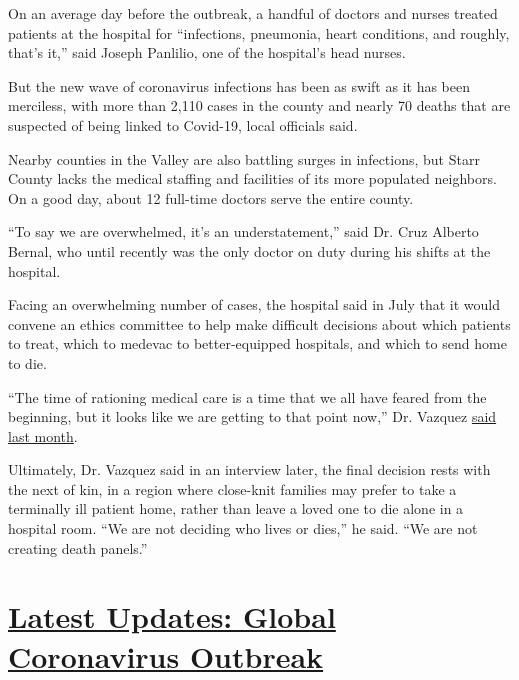 On an average day before the outbreak, a handful of doctors and nurses
treated patients at the hospital for ``infections, pneumonia, heart
conditions, and roughly, that's it,'' said Joseph Panlilio, one of the
hospital's head nurses.

But the new wave of coronavirus infections has been as swift as it has
been merciless, with more than 2,110 cases in the county and nearly 70
deaths that are suspected of being linked to Covid-19, local officials
said.

Nearby counties in the Valley are also battling surges in infections,
but Starr County lacks the medical staffing and facilities of its more
populated neighbors. On a good day, about 12 full-time doctors serve the
entire county.

``To say we are overwhelmed, it's an understatement,'' said Dr. Cruz
Alberto Bernal, who until recently was the only doctor on duty during
his shifts at the hospital.

Facing an overwhelming number of cases, the hospital said in July that
it would convene an ethics committee to help make difficult decisions
about which patients to treat, which to medevac to better-equipped
hospitals, and which to send home to die.

``The time of rationing medical care is a time that we all have feared
from the beginning, but it looks like we are getting to that point
now,'' Dr. Vazquez
\href{https://www.themonitor.com/2020/07/19/starr-county-form-ethics-committee-responsible-virus-resources/}{said
last month}.

Ultimately, Dr. Vazquez said in an interview later, the final decision
rests with the next of kin, in a region where close-knit families may
prefer to take a terminally ill patient home, rather than leave a loved
one to die alone in a hospital room. ``We are not deciding who lives or
dies,'' he said. ``We are not creating death panels.''

\hypertarget{latest-updates-global-coronavirus-outbreak}{%
\section{\texorpdfstring{\href{https://www.nytimes3xbfgragh.onion/2020/08/04/world/coronavirus-cases.html?action=click\&pgtype=Article\&state=default\&region=MAIN_CONTENT_1\&context=storylines_live_updates}{Latest
Updates: Global Coronavirus
Outbreak}}{Latest Updates: Global Coronavirus Outbreak}}\label{latest-updates-global-coronavirus-outbreak}}

